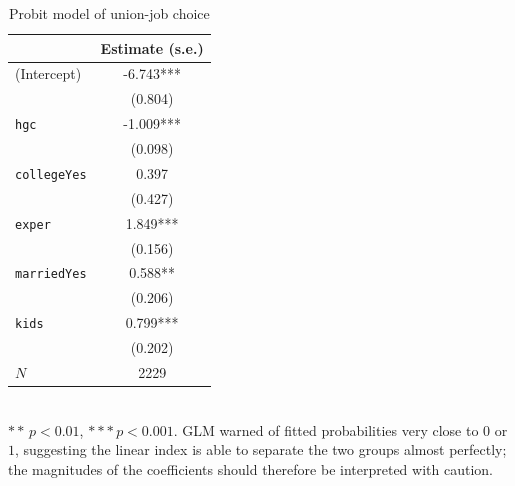\documentclass[11pt]{article}
\begin{document}
\begin{table}[h]
    \centering
    \caption{Probit model of union-job choice}
    \label{tab:probit}
    \begin{tabular}{lc}
        \toprule
        & Estimate (s.e.) \\
        \midrule
        (Intercept)         & -6.743*** \\
                            & (0.804)   \\
        \texttt{hgc}        & -1.009*** \\
                            & (0.098)   \\
        \texttt{collegeYes} &  0.397    \\
                            & (0.427)   \\
        \texttt{exper}      &  1.849*** \\
                            & (0.156)   \\
        \texttt{marriedYes} &  0.588**  \\
                            & (0.206)   \\
        \texttt{kids}       &  0.799*** \\
                            & (0.202)   \\
        \midrule
        $N$                 & 2229    \\
        \bottomrule
    \end{tabular}\\[2pt]
    \footnotesize{$**\,p<0.01$, $***\,p<0.001$.  GLM warned of fitted
    probabilities very close to $0$ or $1$, suggesting the linear index is
    able to separate the two groups almost perfectly; the magnitudes of the
    coefficients should therefore be interpreted with caution.}
\end{table}
\end{document}
